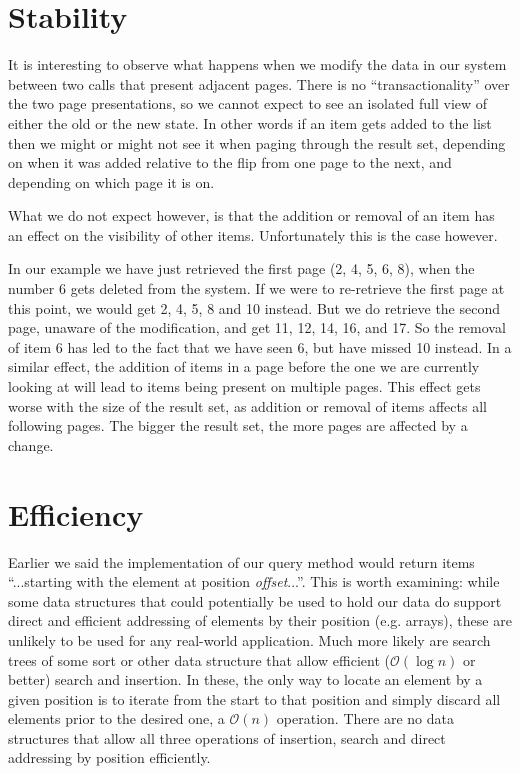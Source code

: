 \documentclass[11pt,a4paper]{article}
\begin{document}
\begin{multicols}{2}
\section*{Stability}
It is interesting to observe what happens when we modify the data in our system
between two calls that present adjacent pages. There is no ``transactionality''
over the two page presentations, so we cannot expect to see an isolated full
view of either the old or the new state. In other words if an item gets added to
the list then we might or might not see it when paging through the result set,
depending on when it was added relative to the flip from one page to the next,
and depending on which page it is on. 

What we do not expect however, is that the addition or removal of an item has an
effect on the visibility of other items. Unfortunately this is the case however. 

In our example we have just retrieved the first page (2, 4, 5, 6, 8), when the
number 6 gets deleted from the system. If we were to re-retrieve the first page
at this point, we would get 2, 4, 5, 8 and 10 instead. But we do retrieve the
second page, unaware of the modification, and get 11, 12, 14, 16, and 17. So the
removal of item 6 has led to the fact that we have seen 6, but have
missed 10 instead. In a similar effect, the addition of items in a page before
the one we are currently looking at will lead to items being present on multiple
pages. This effect gets worse with the size of the result set, as addition or
removal of items affects all following pages. The bigger the result set, the
more pages are affected by a change.

\section*{Efficiency}
Earlier we said the implementation of our query method would return items 
``...starting with the element at position {\em offset}...''. This is worth
examining: while some data structures that could potentially be used to hold our
data do support direct and efficient addressing of elements by their position
(e.g. arrays), these are unlikely to be used for any real-world application.
Much more likely are search trees of some sort or other data structure that 
allow efficient ($\mathcal{O}(\log{}n)$ or better) search and insertion. In 
these, the only way to locate an element by a
given position is to iterate from the start to that position and simply discard
all elements prior to the desired one, a $\mathcal{O}(n)$ operation. There are
no data structures that allow all three operations of insertion, search and
direct addressing by position efficiently. 


\end{multicols}
\end{document}
